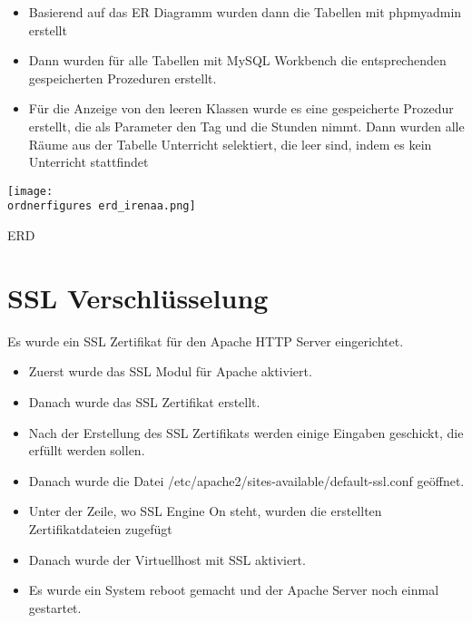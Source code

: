 \begin{itemize}
	\item Basierend auf das ER Diagramm wurden dann die Tabellen mit phpmyadmin erstellt
\end{itemize}
\begin{itemize}
	\item Dann wurden für alle Tabellen mit MySQL Workbench die entsprechenden gespeicherten Prozeduren erstellt. 
\end{itemize}
\begin{itemize}
	\item F\"ur die Anzeige von den leeren Klassen wurde es eine gespeicherte Prozedur erstellt, die als Parameter den Tag und die Stunden nimmt. Dann wurden alle R\"aume aus der Tabelle Unterricht selektiert, die leer sind, indem es kein Unterricht stattfindet
\end{itemize}
\captionsetup{type=figure}
\texttt{[image: \\ordnerfigures erd\_irenaa.png]}
\caption{ERD}
\label{erd} 
\captionsetup{type=figure} 	
\section{SSL Verschlüsselung}
Es wurde ein SSL Zertifikat für den Apache HTTP Server eingerichtet.
\begin{itemize}
	\item Zuerst wurde das SSL Modul für Apache aktiviert.
\end{itemize}
\begin{itemize}
	\item Danach wurde das SSL Zertifikat erstellt. 
\end{itemize}
\begin{itemize}
	\item Nach der Erstellung des SSL Zertifikats werden einige Eingaben geschickt, die erfüllt werden sollen. 
\end{itemize}
\begin{itemize}
	\item Danach wurde die Datei /etc/apache2/sites-available/default-ssl.conf geöffnet.
\end{itemize}
\begin{itemize}
	\item Unter der Zeile, wo SSL Engine On steht, wurden die erstellten Zertifikatdateien zugefügt
\end{itemize}
\begin{itemize}
	\item Danach wurde der Virtuellhost mit SSL aktiviert. 
\end{itemize}
\begin{itemize}
	\item Es wurde ein System reboot gemacht und der Apache Server noch einmal gestartet. \cite{50_SSS}
\end{itemize}
